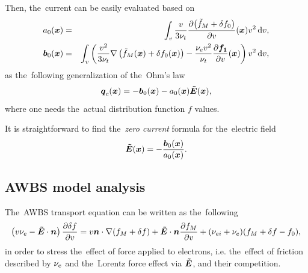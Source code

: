 \documentclass[preprint,12pt]{elsarticle}
\newcounter{bla}
\begin{document}
Then, the~current can be easily evaluated based on
\begin{eqnarray}
  a_0(\boldsymbol{x}) &=& \int_{v}\frac{v}{3 \nu_{t}} \frac{\partial{\left(\tilde{f}_M+ \delta f_0\right)}}{\partial{v}}(\boldsymbol{x})
  v^2\, \text{d}v , \nonumber \\
  \boldsymbol{b}_{0}(\boldsymbol{x}) &=& \int_{v}\left(  
  \frac{v^2}{3 \nu_{t}}\nabla\left(\tilde{f}_M(\boldsymbol{x}) + \delta f_0(\boldsymbol{x})\right)
  - \frac{\nu_{e}v^2}{\nu_{t}}\frac{\partial{\boldsymbol{f_1}}}{\partial{v}}(\boldsymbol{x})
  \right)v^2\, \text{d}v , \nonumber 
\end{eqnarray}
as the~following generalization of the~Ohm's law
\begin{equation}
  \boldsymbol{q}_c(\boldsymbol{x}) 
  = -\boldsymbol{b}_{0}(\boldsymbol{x}) 
  - a_{0}(\boldsymbol{x})\boldsymbol{\tilde{E}}(\boldsymbol{x}) ,
  \nonumber \label{eq:OOE_HOFcurrent}
\end{equation}
where one needs the~actual distribution function $f$ values.


It is straightforward to find the~\textit{zero current} formula for 
the~electric field
\begin{equation}
  \boldsymbol{\tilde{E}}(\boldsymbol{x}) = -\frac{\boldsymbol{b}_{0}(\boldsymbol{x})}{a_{0}(\boldsymbol{x})} .
  \label{eq:OOE_E_j0}
\end{equation}

\subsection{AWBS model analysis}
\label{sec:OOE_AWBS_model_analysis}
The~AWBS transport equation can be written as the~following
\begin{multline}
  \left(v \nu_{e} - \boldsymbol{\tilde{E}}\cdot\boldsymbol{n}\right)\frac{\partial{\delta f}}{\partial{v}} 
  =
  v\boldsymbol{n}\cdot\nabla (f_M + \delta f) + \boldsymbol{\tilde{E}}\cdot\boldsymbol{n}\frac{\partial{f_M}}{\partial{v}} 
  + (\nu_{ei} + \nu_{e}) (f_M + \delta f - f_0) ,
  \label{eq:OOE_AWBS_model_analysis}
\end{multline}
in order to stress the~effect of force applied to electrons, i.e. the~effect
of friction described by $\nu_{e}$ and the~Lorentz force effect via $\boldsymbol{\tilde{E}}$, 
and their competition.
\end{document}
